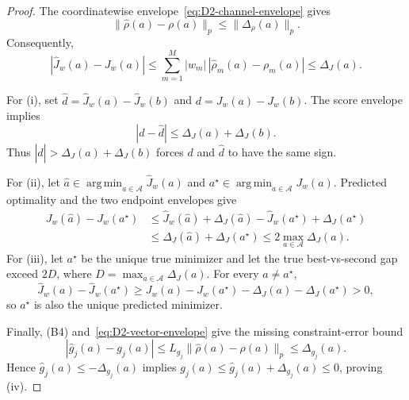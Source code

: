 \begin{proof}
The coordinatewise envelope~\eqref{eq:D2-channel-envelope} gives
\begin{equation}
  \|\hat\rho(a)-\rho(a)\|_p
  \leq\|\Delta_\rho(a)\|_p.
  \label{eq:D2-vector-envelope}
\end{equation}
Consequently,
\[
  |\hat J_w(a)-J_w(a)|
  \leq\sum_{m=1}^{M}|w_m|\,
       |\hat\rho_m(a)-\rho_m(a)|
  \leq\Delta_J(a).
\]

For (i), set
$\hat d=\hat J_w(a)-\hat J_w(b)$ and
$d=J_w(a)-J_w(b)$.  The score envelope implies
\[
  |d-\hat d|\leq\Delta_J(a)+\Delta_J(b).
\]
Thus $|\hat d|>\Delta_J(a)+\Delta_J(b)$ forces $d$ and $\hat d$ to
have the same sign.

For (ii), let
$\hat a\in\operatorname*{arg\,min}_{a\in\mathcal A}\hat J_w(a)$ and
$a^\star\in\operatorname*{arg\,min}_{a\in\mathcal A}J_w(a)$.  Predicted
optimality and the two endpoint envelopes give
\begin{align*}
  J_w(\hat a)-J_w(a^\star)
  &\leq \hat J_w(\hat a)+\Delta_J(\hat a)
       -\hat J_w(a^\star)+\Delta_J(a^\star)\\
  &\leq \Delta_J(\hat a)+\Delta_J(a^\star)
  \leq 2\max_{a\in\mathcal A}\Delta_J(a).
\end{align*}
For (iii), let $a^\star$ be the unique true minimizer and let the true
best-vs-second gap exceed $2D$, where
$D=\max_{a\in\mathcal A}\Delta_J(a)$.  For every $a\neq a^\star$,
\[
  \hat J_w(a)-\hat J_w(a^\star)
  \geq J_w(a)-J_w(a^\star)-\Delta_J(a)-\Delta_J(a^\star)>0,
\]
so $a^\star$ is also the unique predicted minimizer.

Finally, (B4) and~\eqref{eq:D2-vector-envelope} give the missing
constraint-error bound
\begin{equation}
  |\hat g_j(a)-g_j(a)|
  \leq L_{g_j}\|\hat\rho(a)-\rho(a)\|_p
  \leq\Delta_{g_j}(a).
  \label{eq:D2-constraint-error-bound}
\end{equation}
Hence
$\hat g_j(a)\leq-\Delta_{g_j}(a)$ implies
$g_j(a)\leq\hat g_j(a)+\Delta_{g_j}(a)\leq0$, proving (iv).
\end{proof}





